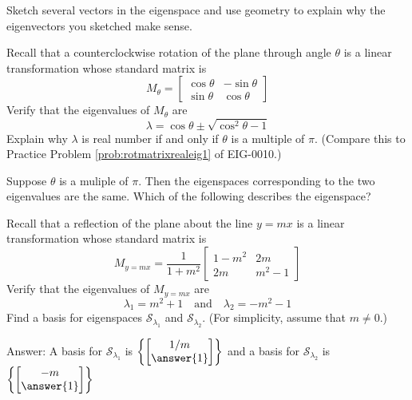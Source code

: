 \documentclass{ximera}
\begin{document}
\begin{problem}
\begin{problem}
Sketch several vectors in the eigenspace and use geometry to explain why the eigenvectors you sketched make sense.
\end{problem}

\begin{problem}\label{prob:rotmatrixrealeig2}
Recall that a counterclockwise rotation of the plane through angle $\theta$ is a linear transformation whose standard matrix is $$M_{\theta}=\begin{bmatrix}\cos\theta&-\sin\theta\\\sin\theta&\cos\theta\end{bmatrix}$$
Verify that the eigenvalues of $M_{\theta}$ are
$$\lambda=\cos\theta\pm\sqrt{\cos^2\theta-1}$$
Explain why $\lambda$ is real number if and only if $\theta$ is a multiple of $\pi$.  (Compare this to Practice Problem \ref{prob:rotmatrixrealeig1} of EIG-0010.)

Suppose $\theta$ is a muliple of $\pi$.  Then the eigenspaces corresponding to the two eigenvalues are the same.  Which of the following describes the eigenspace?
\begin{multipleChoice}
\end{multipleChoice}

\end{problem}

\begin{problem}\label{prob:eigvectorstransfr2_3}
Recall that a reflection of the plane about the line $y=mx$ is a linear transformation whose standard matrix is
$$M_{y=mx}=\frac{1}{1+m^2}\begin{bmatrix}
1-m^2 & 2m \\
2m & m^2-1
\end{bmatrix}$$
Verify that the eigenvalues of $M_{y=mx}$ are
$$\lambda_1=m^2+1\quad\text{and}\quad\lambda_2=-m^2-1$$
Find a basis for eigenspaces $\mathcal{S}_{\lambda_1}$ and $\mathcal{S}_{\lambda_2}$.  (For simplicity, assume that $m\neq 0$.)

Answer:  A basis for $\mathcal{S}_{\lambda_1}$ is $\left\{\begin{bmatrix}1/m\\\answer{1}\end{bmatrix}\right\}$
and a basis for $\mathcal{S}_{\lambda_2}$ is $\left\{\begin{bmatrix}-m\\\answer{1}\end{bmatrix}\right\}$


\end{problem}
\end{problem}
\end{document}
